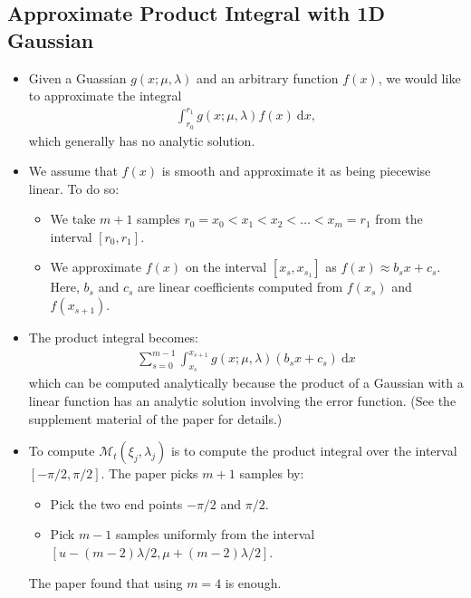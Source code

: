 \documentclass[10pt]{article}
\newcommand{\dee}{\mathrm{d}}
\newcommand{\modeint}{\mathcal{M}}
\begin{document}
  \subsection{Approximate Product Integral with 1D Gaussian}
  \begin{itemize}
    \item Given a Guassian $g(x; \mu,\lambda)$ and an arbitrary function $f(x)$, we would like to approximate the integral
    \begin{align*}
      \int_{r_0}^{r_1} g(x; \mu, \lambda) f(x)\ \dee x,
    \end{align*}
    which generally has no analytic solution.
    
    \item We assume that $f(x)$ is smooth and approximate it as being piecewise linear. To do so:
    \begin{itemize}
      \item We take $m+1$ samples $r_0 = x_0 < x_1 < x_2 < \dotsc < x_m = r_1$ from the interval $[r_0, r_1]$. 
      \item We approximate $f(x)$ on the interval $[x_s, x_{s_1}]$ as $f(x) \approx b_sx + c_s$.\\ Here, $b_s$ and $c_s$ are linear coefficients computed from $f(x_s)$ and $f(x_{s+1})$. 
    \end{itemize}
    
    \item The product integral becomes:
    \begin{align*}
      \sum_{s=0}^{m-1} \int_{x_s}^{x_{s+1}} g(x; \mu, \lambda) (b_s x + c_s)\ \dee x
    \end{align*}
    which can be computed analytically because the product of a Gaussian with a linear function has an analytic solution involving the error function. (See the supplement material of the paper for details.)
    
    \item To compute $\modeint_t(\xi_j, \lambda_j)$ is to compute the product integral over the interval $[-\pi/2, \pi/2]$. The paper picks $m+1$ samples by:
    \begin{itemize}
      \item Pick the two end points $-\pi/2$ and $\pi/2$.
      \item Pick $m-1$ samples uniformly from the interval $[u - (m-2)\lambda/2, \mu+(m-2)\lambda/2]$. 
    \end{itemize}
    The paper found that using $m=4$ is enough.
  \end{itemize}
  
\end{document}
